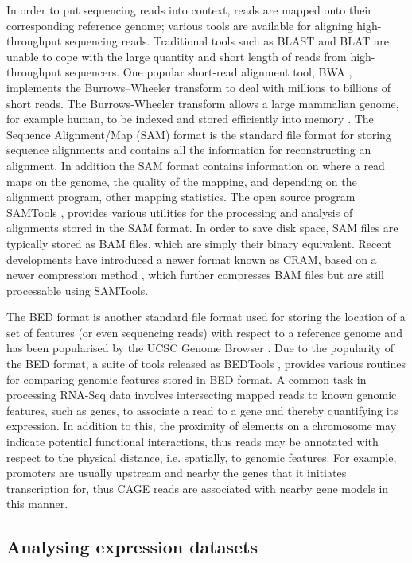In order to put sequencing reads into context, reads are mapped onto their corresponding reference genome; various tools are available for aligning high-throughput sequencing reads. Traditional tools such as BLAST \citep{pmid2231712} and BLAT \citep{pmid11932250} are unable to cope with the large quantity and short length of reads from high-throughput sequencers. One popular short-read alignment tool, BWA \citep{pmid19451168}, implements the Burrows–Wheeler transform to deal with millions to billions of short reads. The Burrows-Wheeler transform allows a large mammalian genome, for example human, to be indexed and stored efficiently into memory \citep{pmid19430453}. The Sequence Alignment/Map (SAM) format \citep{pmid19505943} is the standard file format for storing sequence alignments and contains all the information for reconstructing an alignment. In addition the SAM format contains information on where a read maps on the genome, the quality of the mapping, and depending on the alignment program, other mapping statistics. The open source program SAMTools \citep{Li15082009}, provides various utilities for the processing and analysis of alignments stored in the SAM format. In order to save disk space, SAM files are typically stored as BAM files, which are simply their binary equivalent. Recent developments have introduced a newer format known as CRAM, based on a newer compression method \citep{pmid21245279}, which further compresses BAM files but are still processable using SAMTools.

The BED format is another standard file format used for storing the location of a set of features (or even sequencing reads) with respect to a reference genome and has been popularised by the UCSC Genome Browser \citep{Kent01062002}. Due to the popularity of the BED format, a suite of tools released as BEDTools \citep{pmid20110278}, provides various routines for comparing genomic features stored in BED format. A common task in processing RNA-Seq data involves intersecting mapped reads to known genomic features, such as genes, to associate a read to a gene and thereby quantifying its expression. In addition to this, the proximity of elements on a chromosome may indicate potential functional interactions, thus reads may be annotated with respect to the physical distance, i.e. spatially, to genomic features. For example, promoters are usually upstream and nearby the genes that it initiates transcription for, thus CAGE reads are associated with nearby gene models in this manner.

\subsection{Analysing expression datasets}

